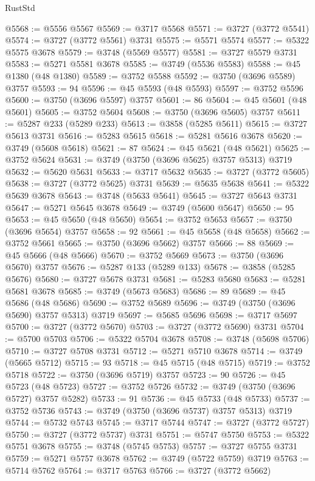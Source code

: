 \begin{lexlean}{RustStd}
\begin{coremodule}
@5568 := @5556 @5567
@5569 := @3717 @5568
@5571 := @3727 (@3772 @5541)
@5574 := @3727 (@3772 @5561) @3731
@5575 := @5571 @5574
@5577 := @5322 @5575 @3678
@5579 := @3748 (@5569 @5577)
@5581 := @3727 @5579 @3731
@5583 := @5271 @5581 @3678
@5585 := @3749 (@5536 @5583)
@5588 := @45 @1380 (@48 @1380)
@5589 := @3752 @5588
@5592 := @3750 (@3696 @5589) @3757
@5593 := 94
@5596 := @45 @5593 (@48 @5593)
@5597 := @3752 @5596
@5600 := @3750 (@3696 @5597) @3757
@5601 := 86
@5604 := @45 @5601 (@48 @5601)
@5605 := @3752 @5604
@5608 := @3750 (@3696 @5605) @3757
@5611 := @5287 @233 (@5289 @233)
@5613 := @3858 (@5285 @5611)
@5615 := @3727 @5613 @3731
@5616 := @5283 @5615
@5618 := @5281 @5616 @3678
@5620 := @3749 (@5608 @5618)
@5621 := 87
@5624 := @45 @5621 (@48 @5621)
@5625 := @3752 @5624
@5631 := @3749 (@3750 (@3696 @5625) @3757 @5313) @3719
@5632 := @5620 @5631
@5633 := @3717 @5632
@5635 := @3727 (@3772 @5605)
@5638 := @3727 (@3772 @5625) @3731
@5639 := @5635 @5638
@5641 := @5322 @5639 @3678
@5643 := @3748 (@5633 @5641)
@5645 := @3727 @5643 @3731
@5647 := @5271 @5645 @3678
@5649 := @3749 (@5600 @5647)
@5650 := 95
@5653 := @45 @5650 (@48 @5650)
@5654 := @3752 @5653
@5657 := @3750 (@3696 @5654) @3757
@5658 := 92
@5661 := @45 @5658 (@48 @5658)
@5662 := @3752 @5661
@5665 := @3750 (@3696 @5662) @3757
@5666 := 88
@5669 := @45 @5666 (@48 @5666)
@5670 := @3752 @5669
@5673 := @3750 (@3696 @5670) @3757
@5676 := @5287 @133 (@5289 @133)
@5678 := @3858 (@5285 @5676)
@5680 := @3727 @5678 @3731
@5681 := @5283 @5680
@5683 := @5281 @5681 @3678
@5685 := @3749 (@5673 @5683)
@5686 := 89
@5689 := @45 @5686 (@48 @5686)
@5690 := @3752 @5689
@5696 := @3749 (@3750 (@3696 @5690) @3757 @5313) @3719
@5697 := @5685 @5696
@5698 := @3717 @5697
@5700 := @3727 (@3772 @5670)
@5703 := @3727 (@3772 @5690) @3731
@5704 := @5700 @5703
@5706 := @5322 @5704 @3678
@5708 := @3748 (@5698 @5706)
@5710 := @3727 @5708 @3731
@5712 := @5271 @5710 @3678
@5714 := @3749 (@5665 @5712)
@5715 := 93
@5718 := @45 @5715 (@48 @5715)
@5719 := @3752 @5718
@5722 := @3750 (@3696 @5719) @3757
@5723 := 90
@5726 := @45 @5723 (@48 @5723)
@5727 := @3752 @5726
@5732 := @3749 (@3750 (@3696 @5727) @3757 @5282)
@5733 := 91
@5736 := @45 @5733 (@48 @5733)
@5737 := @3752 @5736
@5743 := @3749 (@3750 (@3696 @5737) @3757 @5313) @3719
@5744 := @5732 @5743
@5745 := @3717 @5744
@5747 := @3727 (@3772 @5727)
@5750 := @3727 (@3772 @5737) @3731
@5751 := @5747 @5750
@5753 := @5322 @5751 @3678
@5755 := @3748 (@5745 @5753)
@5757 := @3727 @5755 @3731
@5759 := @5271 @5757 @3678
@5762 := @3749 (@5722 @5759) @3719
@5763 := @5714 @5762
@5764 := @3717 @5763
@5766 := @3727 (@3772 @5662)

\end{coremodule}
\end{lexlean}
